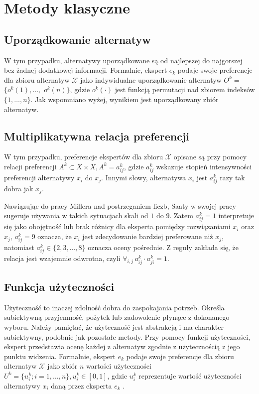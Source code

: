 \section{Metody klasyczne}

\subsection{Uporządkowanie alternatyw}

W tym przypadku, alternatywy uporządkowane są od najlepszej do najgorszej bez
żadnej dodatkowej informacji. Formalnie, ekspert $e_k$ podaje swoje preferencje
dla zbioru alternatyw $\mathcal{X}$ jako indywidualne uporządkowanie alternatyw
$ O^k =$ $\{o^k(1), \dotsc,$ $o^k(n)\}$, gdzie $o^k(\cdot)$ jest funkcją
permutacji nad zbiorem indeksów $\{1,\dotsc,n\}$. Jak wspomniano wyżej, wynikiem
jest uporządkowany zbiór alternatyw.

\subsection{Multiplikatywna relacja preferencji}
W tym przypadku, preferencje ekspertów dla zbioru $\mathcal{X}$ opisane są przy
pomocy relacji preferencji $A^k \subset X \times X, A^k = a^k_{ij}$, gdzie
$a^k_{ij}$ wskazuje stopień intensywności preferencji alternatywy $x_i$ do
$x_j$. Innymi słowy, alternatywa $x_i$ jest $a^k_{ij}$ razy tak dobra jak $x_j$.

Nawiązując do pracy Millera \cite{Miller1993} nad postrzeganiem liczb, Saaty w
swojej pracy \cite{Saaty2000} sugeruje używania w takich sytuacjach skali od $1$
do $9$. Zatem $a^k_{ij} = 1$ interpretuje się jako obojętność lub brak różnicy
dla eksperta pomiędzy rozwiązaniami $x_i$ oraz $x_j$, $a^k_{ij}=9$ oznacza, że
$x_i$ jest zdecydowanie bardziej preferowane niż $x_j$, natomiast $a^k_{ij} \in
\{ 2,3, \dotsc, 8\}$ oznacza oceny pośrednie. Z reguły zakłada się, że relacja
jest wzajemnie odwrotna, czyli $\forall_{i,j} \, a^k_{ij} \cdot a^k_{ji} = 1$.

\subsection{Funkcja użyteczności}
Użyteczność to inaczej zdolność dobra do zaspokajania potrzeb. Określa
subiektywną przyjemność, pożytek lub zadowolenie płynące z dokonanego wyboru.
Należy pamiętać, że użyteczność jest abstrakcją i ma charakter subiektywny,
podobnie jak pozostałe metody. Przy pomocy funkcji użyteczności, ekspert
przedstawia ocenę każdej z alternatyw zgodnie z użytecznością z jego punktu
widzenia. Formalnie, ekspert $e_k$ podaje swoje preferencje dla zbioru
alternatyw $\mathcal{X}$ jako zbiór $n$ wartości użyteczności $U^k = \{u^k_i;
i=1,\dotsc,n\}, u^k_i \in [0,1]$, gdzie $u^k_i$ reprezentuje wartość
użyteczności alternatywy $x_i$ daną przez eksperta $e_k$ \cite{Tanino1990}.

